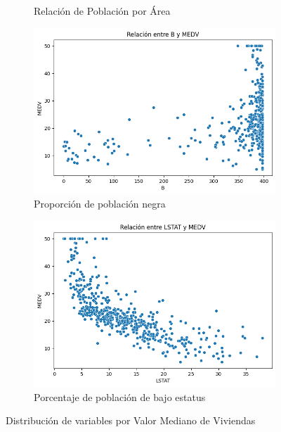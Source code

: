\documentclass[12pt,a4paper]{article}
\begin{document}
\begin{figure}[H]
\begin{subfigure}[t]{0.24\textwidth}
    \caption{\footnotesize Relación de Población por Área}
    \label{fig:modelo_ptratio}
\end{subfigure}
\hfill
\begin{subfigure}[t]{0.24\textwidth}
    \centering
    \includegraphics[width=\textwidth]{images/b_medv.png}
    \caption{\footnotesize Proporción de población negra}
    \label{fig:modelo_b}
\end{subfigure}

\vspace{0.2cm}

\begin{subfigure}[t]{0.24\textwidth}
    \centering
    \includegraphics[width=\textwidth]{images/lstat_medv.png}
    \caption{\footnotesize Porcentaje de población de bajo estatus}
    \label{fig:modelo_lstat}
\end{subfigure}

\caption{Distribución de variables por Valor Mediano de Viviendas}
\label{fig:distribucion_variables}
\end{figure}
\end{document}
